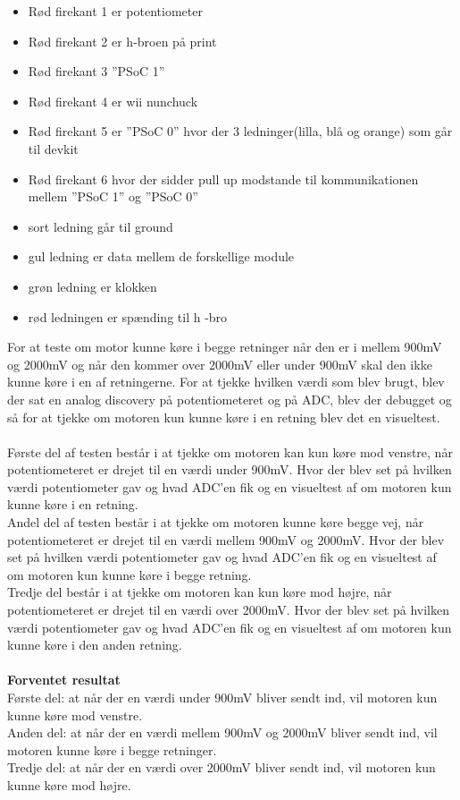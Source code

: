 \begin{itemize}
	\item Rød firekant 1 er potentiometer
	\item	Rød firekant 2 er h-broen på print
	\item	Rød firekant 3 ”PSoC 1”
	\item	Rød firekant 4 er wii nunchuck
	\item	Rød firekant 5 er ”PSoC 0” hvor der 3 ledninger(lilla, blå og orange) som går til devkit 
	\item Rød firekant 6 hvor der sidder pull up modstande til kommunikationen mellem ”PSoC 1” og ”PSoC 0”
	\item	sort ledning går til ground 
	\item	gul ledning er data mellem de forskellige module
	\item grøn ledning er klokken
	\item rød ledningen er spænding til h -bro
	
\end{itemize}
For at teste om motor kunne køre i begge retninger når den er i mellem 900mV og 2000mV og når den kommer over 2000mV eller under 900mV skal den ikke kunne køre i en af retningerne.
For at tjekke hvilken værdi som blev brugt, blev der sat en analog discovery på potentiometeret og på ADC, blev der debugget og så for at tjekke om motoren kun kunne køre i en retning blev det en visueltest. \\
\\
Første del af testen består i at tjekke om motoren kan kun køre mod venstre, når potentiometeret er drejet til en værdi under 900mV. Hvor der blev set på hvilken værdi potentiometer gav og hvad ADC’en fik og en visueltest af om motoren kun kunne køre i en retning.\\
Andel del af testen består i at tjekke om motoren kunne køre begge vej, når potentiometeret er drejet til en værdi mellem 900mV og 2000mV. Hvor der blev set på hvilken værdi potentiometer gav og hvad ADC’en fik og en visueltest af om motoren kun kunne køre i begge retning.\\
Tredje del består i at tjekke om motoren kan kun køre mod højre, når potentiometeret er drejet til en værdi over 2000mV. Hvor der blev set på hvilken værdi potentiometer gav og hvad ADC’en fik og en visueltest af om motoren kun kunne køre i den anden retning.\\
\\
\textbf{Forventet resultat }
\\Første del: at når der en værdi under 900mV bliver sendt ind, vil motoren kun kunne køre mod venstre.\\
Anden del: at når der en værdi mellem 900mV og 2000mV bliver sendt ind, vil motoren kunne køre i begge retninger.\\
Tredje del: at når der en værdi over 2000mV bliver sendt ind, vil motoren kun kunne køre mod højre.

